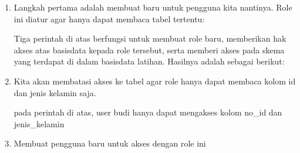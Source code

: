 \documentclass[letterpaper,10pt,english]{sphinxmanual}
\begin{document}
\begin{enumerate}
%
\item {} 
Langkah pertama adalah membuat  baru untuk pengguna kita nantinya. Role ini diatur agar hanya dapat membaca tabel tertentu:

\begin{sphinxVerbatim}[commandchars=\\\{\}]
  
      
      
\end{sphinxVerbatim}

Tiga perintah di atas berfungsi untuk membuat role baru, memberikan hak akses atas basisdata  kepada role tersebut, serta memberi akses pada skema  yang terdapat di dalam basisdata latihan. Hasilnya adalah sebagai berikut:


\item {} 
Kita akan membatasi akses ke tabel  agar role  hanya dapat membaca kolom id dan jenis kelamin saja.

\begin{sphinxVerbatim}[commandchars=\\\{\}]
        
\end{sphinxVerbatim}

pada perintah di atas, user budi hanya dapat mengakses kolom no\_id dan jenis\_kelamin

\item {} 
Membuat pengguna baru untuk akses dengan role ini

\begin{sphinxVerbatim}[commandchars=\\\{\}]
     
   
\end{sphinxVerbatim}


\end{enumerate}
\end{document}
